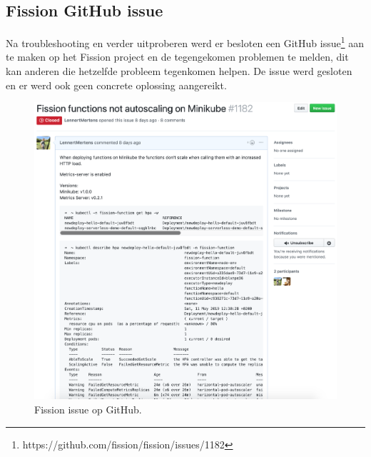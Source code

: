 \subsection{Fission GitHub issue}
\label{sec:fission-github-issue}
Na troubleshooting en verder uitproberen werd er besloten een GitHub issue\footnote{https://github.com/fission/fission/issues/1182} aan te maken op het Fission project en de tegengekomen problemen te melden, dit kan anderen die hetzelfde probleem tegenkomen helpen. De issue werd gesloten en er werd ook geen concrete oplossing aangereikt.
\begin{figure}
    \includegraphics[width=1\textwidth]{img/fission-github-issue.png}
    \caption{Fission issue op GitHub.}
    \label{fig:fission-github-issue}  
\end{figure}